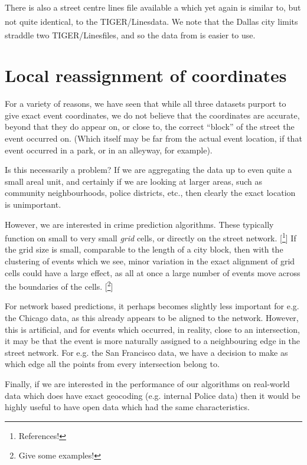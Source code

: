 \documentclass[twoside,a4paper,twocolumn,10pt]{article}
\theoremstyle{plain}
\theoremstyle{definition}
\newcommand{\regsym}{\textsuperscript{\textregistered}}
\begin{document}
There is also a street centre lines file available a \cite{dstreets} which yet again is similar
to, but not quite identical, to the TIGER/Lines\regsym data.  We note that the Dallas city
limits straddle two TIGER/Lines\regsym files, and so the data from \cite{dstreets} is easier to use.



\section{Local reassignment of coordinates}\label{sec:reassign}

For a variety of reasons, we have seen that while all three datasets purport to give
exact event coordinates, we do not believe that the coordinates are accurate, beyond
that they do appear on, or close to, the correct ``block'' of the street the event
occurred on.  (Which itself may be far from the actual event location, if that
event occurred in a park, or in an alleyway, for example).

Is this necessarily a problem?  If we are aggregating the data up to even quite a small
areal unit, and certainly if we are looking at larger areas, such as community
neighbourhoods, police districts, etc., then clearly the exact location is unimportant.

However, we are interested in crime prediction algorithms.  These typically function
on small to very small \emph{grid} cells, or directly on the street network.
[\footnote{References!}]
If the grid size is small, comparable to the length of a city block, then with the
clustering of events which we see, minor variation in the exact alignment of
grid cells could have a large effect, as all at once a large number of events move
across the boundaries of the cells.
[\footnote{Give some examples!}]

For network based predictions, it perhaps becomes slightly less important for
e.g. the Chicago data, as this already appears to be aligned to the network.
However, this is artificial, and for events which occurred, in reality, close
to an intersection, it may be that the event is more naturally assigned to a
neighbouring edge in the street network.  For e.g. the San Francisco data, we
have a decision to make as which edge all the points from every intersection
belong to.

Finally, if we are interested in the performance of our algorithms on real-world data
which does have exact geocoding (e.g. internal Police data) then it would be highly
useful to have open data which had the same characteristics.
\end{document}
